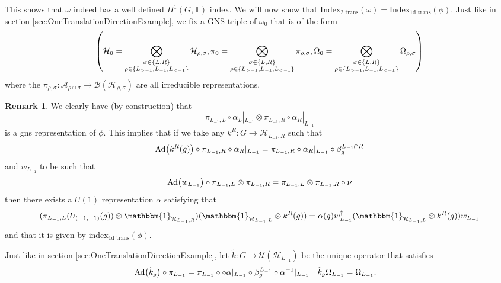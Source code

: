 \documentclass[12pt,a4paper,twoside]{article}
\let\originalleft\left
\let\originalright\right
\renewcommand{\left}{\mathopen{}\mathclose\bgroup\originalleft}
\renewcommand{\right}{\aftergroup\egroup\originalright}
\newcommand{\UU}{\mathcal U}
\newcommand{\BB}{\mathcal B}
\newcommand{\HH}{\mathcal H}
\newcommand{\TT}{\mathbb T}
\renewcommand{\AA}{\mathcal A}
\newcommand{\id}{\mathbbm{1}}
\newcommand{\Ad}[1]{\textrm{Ad}\left(#1\right)}
\theoremstyle{definition}
\newtheorem{remark}[theorem]{Remark}
\numberwithin{equation}{section}
\begin{document}
This shows that $\omega$ indeed has a well defined $H^1(G,\TT)$ index. We will now show that $\textrm{Index}_{\text{2 trans}}(\omega)=\textrm{Index}_{\text{1d trans}}(\phi)$. Just like in section \ref{sec:OneTranslationDirectionExample}, we fix a GNS triple of $\omega_0$ that is of the form
\begin{equation}
	\left(\HH_0=\bigotimes_{\substack{\sigma\in\{L,R\}\\ \rho\in\{L_{>-1},L_{-1},L_{<-1}\}}}\HH_{\rho,\sigma},\pi_0=\bigotimes_{\substack{\sigma\in\{L,R\}\\ \rho\in\{L_{>-1},L_{-1},L_{<-1}\}}}\pi_{\rho,\sigma},\Omega_0=\bigotimes_{\substack{\sigma\in\{L,R\}\\ \rho\in\{L_{>-1},L_{-1},L_{<-1}\}}}\Omega_{\rho,\sigma}\right)
\end{equation}
where the $\pi_{\rho,\sigma}:\AA_{\rho\cap\sigma}\rightarrow\BB(\HH_{\rho,\sigma})$ are all irreducible representations.
\begin{remark}\label{rem:GNS_One_DimensionalTwoTranslations}
	We clearly have (by construction) that
	\begin{equation}
		\pi_{L_{-1},L}\circ\alpha_L|_{L_{-1}}\otimes \pi_{L_{-1},R}\circ\alpha_R|_{L_{-1}}
	\end{equation}
	is a gns representation of $\phi$. This implies that if we take any $k^R:G\rightarrow \HH_{L_{-1},R}$ such that
	\begin{equation}
		\Ad{k^R(g)}\circ\pi_{L_{-1},R}\circ\alpha_R|_{L_{-1}}=\pi_{L_{-1},R}\circ\alpha_R|_{L_{-1}}\circ\beta_{g}^{L_{-1}\cap R}
	\end{equation}
	and $w_{L_{-1}}$ to be such that
	\begin{equation}
		\Ad{w_{L_{-1}}}\circ\pi_{L_{-1},L}\otimes \pi_{L_{-1},R}=\pi_{L_{-1},L}\otimes \pi_{L_{-1},R}\circ\nu
	\end{equation}
	then there exists a $U(1)$ representation $\alpha$ satisfying that
	\begin{equation}
		(\pi_{L_{-1},L}(U_{(-1,-1)}(g))\otimes \id_{\HH_{L_{-1},R}}) (\id_{\HH_{L_{-1},L}}\otimes k^R(g))=\alpha(g) w_{L_{-1}}^\dagger(\id_{\HH_{L_{-1},L}}\otimes k^R(g))w_{L_{-1}}
	\end{equation}
	and that it is given by $\textrm{index}_{\text{1d trans}}(\phi)$.
\end{remark}
Just like in section \ref{sec:OneTranslationDirectionExample}, let $\tilde k:G\rightarrow \UU(\HH_{L_{-1}})$ be the unique operator that satisfies
\begin{align}
	\Ad{\tilde{k}_g}\circ\pi_{L_{-1}}&=\pi_{L_{-1}}\circ \circ\alpha|_{L_{-1}}\circ\beta_g^{L_{-1}}\circ \alpha^{-1}|_{L_{-1}}&\tilde k_g\Omega_{L_{-1}}&=\Omega_{L_{-1}}.
\end{align}
\end{document}
